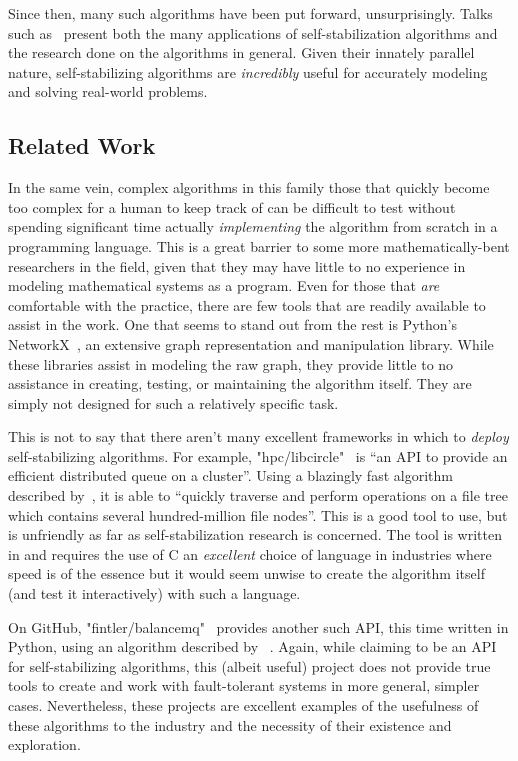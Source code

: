 Since then, many such algorithms have been put forward, unsurprisingly.
Talks such as~\autocite{dolev:talk} present both
  the many applications of self-stabilization algorithms and
  the research done on the algorithms in general.
Given their innately parallel nature,
  self-stabilizing algorithms are \emph{incredibly} useful
  for accurately modeling and solving real-world problems.

\subsection{Related Work}
\label{sec:introduction:related-work}
In the same vein, complex algorithms in this family
  \Dash those that quickly become too complex for a human to keep track of \Dash
  can be difficult to test without spending significant time
  actually \emph{implementing} the algorithm from scratch in a programming language.
This is a great barrier to some more mathematically-bent researchers in the field,
  given that they may have little to no experience in modeling mathematical systems as a program.
Even for those that \emph{are} comfortable with the practice,
  there are few tools that are readily available to assist in the work.
One that seems to stand out from the rest is Python's NetworkX~\autocite{hagberg:networkx},
  an extensive graph representation and manipulation library.
While these libraries assist in modeling the raw graph,
  they provide little to no assistance in creating, testing, or maintaining the algorithm itself.
They are simply not designed for such a relatively specific task.

This is not to say that there aren't many excellent frameworks in which
  to \emph{deploy} self-stabilizing algorithms.
For example, "hpc/libcircle"~\autocite{gh:libcircle} is
  \enquote{an API to provide an efficient distributed queue on a cluster}.
Using a blazingly fast algorithm described by~\autocite{lafon:balanceMQ},
  it is able to \enquote{quickly traverse and perform operations on a file tree
    which contains several hundred-million file nodes}.
This is a good tool to use, but is unfriendly as far as self-stabilization research is concerned.
The tool is written in and requires the use of C
  \Dash an \emph{excellent} choice of language in industries where speed is of the essence \Dash
  but it would seem unwise to create the algorithm itself
  (and test it interactively) with such a language.

On GitHub, "fintler/balancemq"~\autocite{gh:balancemq} provides another such API,
  this time written in Python,
  using an algorithm described by \citeauthor{lafon:balanceMQ}~\autocite{lafon:balanceMQ}.
Again, while claiming to be an API for self-stabilizing algorithms,
  this (albeit useful) project does not provide true tools to create and work with
  fault-tolerant systems in more general, simpler cases.
Nevertheless, these projects are excellent examples of the
  usefulness of these algorithms to the industry and
  the necessity of their existence and exploration.

